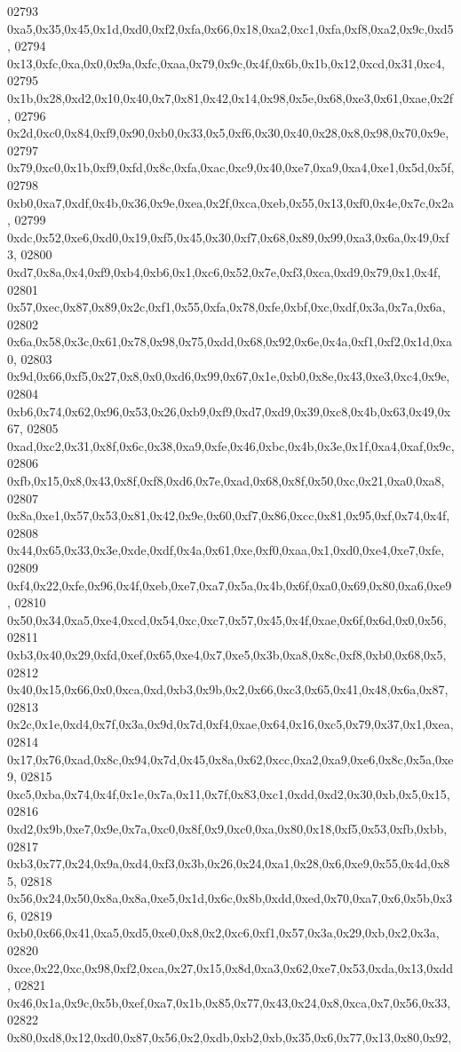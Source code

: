 \begin{DoxyCode}
02793   0xa5,0x35,0x45,0x1d,0xd0,0xf2,0xfa,0x66,0x18,0xa2,0xc1,0xfa,0xf8,0xa2,0x9c,0xd5,
02794   0x13,0xfc,0xa,0x0,0x9a,0xfc,0xaa,0x79,0x9c,0x4f,0x6b,0x1b,0x12,0xcd,0x31,0xc4,
02795   0x1b,0x28,0xd2,0x10,0x40,0x7,0x81,0x42,0x14,0x98,0x5e,0x68,0xe3,0x61,0xae,0x2f,
02796   0x2d,0xc0,0x84,0xf9,0x90,0xb0,0x33,0x5,0xf6,0x30,0x40,0x28,0x8,0x98,0x70,0x9e,
02797   0x79,0xc0,0x1b,0xf9,0xfd,0x8c,0xfa,0xac,0xc9,0x40,0xe7,0xa9,0xa4,0xe1,0x5d,0x5f,
02798   0xb0,0xa7,0xdf,0x4b,0x36,0x9e,0xea,0x2f,0xca,0xeb,0x55,0x13,0xf0,0x4e,0x7c,0x2a,
02799   0xdc,0x52,0xe6,0xd0,0x19,0xf5,0x45,0x30,0xf7,0x68,0x89,0x99,0xa3,0x6a,0x49,0xf3,
02800   0xd7,0x8a,0x4,0xf9,0xb4,0xb6,0x1,0xc6,0x52,0x7e,0xf3,0xca,0xd9,0x79,0x1,0x4f,
02801   0x57,0xec,0x87,0x89,0x2c,0xf1,0x55,0xfa,0x78,0xfe,0xbf,0xc,0xdf,0x3a,0x7a,0x6a,
02802   0x6a,0x58,0x3c,0x61,0x78,0x98,0x75,0xdd,0x68,0x92,0x6e,0x4a,0xf1,0xf2,0x1d,0xa0,
02803   0x9d,0x66,0xf5,0x27,0x8,0x0,0xd6,0x99,0x67,0x1e,0xb0,0x8e,0x43,0xe3,0xc4,0x9e,
02804   0xb6,0x74,0x62,0x96,0x53,0x26,0xb9,0xf9,0xd7,0xd9,0x39,0xc8,0x4b,0x63,0x49,0x67,
02805   0xad,0xc2,0x31,0x8f,0x6c,0x38,0xa9,0xfe,0x46,0xbc,0x4b,0x3e,0x1f,0xa4,0xaf,0x9c,
02806   0xfb,0x15,0x8,0x43,0x8f,0xf8,0xd6,0x7e,0xad,0x68,0x8f,0x50,0xc,0x21,0xa0,0xa8,
02807   0x8a,0xe1,0x57,0x53,0x81,0x42,0x9e,0x60,0xf7,0x86,0xcc,0x81,0x95,0xf,0x74,0x4f,
02808   0x44,0x65,0x33,0x3e,0xde,0xdf,0x4a,0x61,0xe,0xf0,0xaa,0x1,0xd0,0xe4,0xe7,0xfe,
02809   0xf4,0x22,0xfe,0x96,0x4f,0xeb,0xe7,0xa7,0x5a,0x4b,0x6f,0xa0,0x69,0x80,0xa6,0xe9,
02810   0x50,0x34,0xa5,0xe4,0xcd,0x54,0xc,0xc7,0x57,0x45,0x4f,0xae,0x6f,0x6d,0x0,0x56,
02811   0xb3,0x40,0x29,0xfd,0xef,0x65,0xe4,0x7,0xe5,0x3b,0xa8,0x8c,0xf8,0xb0,0x68,0x5,
02812   0x40,0x15,0x66,0x0,0xca,0xd,0xb3,0x9b,0x2,0x66,0xc3,0x65,0x41,0x48,0x6a,0x87,
02813   0x2c,0x1e,0xd4,0x7f,0x3a,0x9d,0x7d,0xf4,0xae,0x64,0x16,0xc5,0x79,0x37,0x1,0xea,
02814   0x17,0x76,0xad,0x8c,0x94,0x7d,0x45,0x8a,0x62,0xcc,0xa2,0xa9,0xe6,0x8c,0x5a,0xe9,
02815   0xc5,0xba,0x74,0x4f,0x1e,0x7a,0x11,0x7f,0x83,0xc1,0xdd,0xd2,0x30,0xb,0x5,0x15,
02816   0xd2,0x9b,0xe7,0x9e,0x7a,0xc0,0x8f,0x9,0xc0,0xa,0x80,0x18,0xf5,0x53,0xfb,0xbb,
02817   0xb3,0x77,0x24,0x9a,0xd4,0xf3,0x3b,0x26,0x24,0xa1,0x28,0x6,0xe9,0x55,0x4d,0x85,
02818   0x56,0x24,0x50,0x8a,0x8a,0xe5,0x1d,0x6c,0x8b,0xdd,0xed,0x70,0xa7,0x6,0x5b,0x36,
02819   0xb0,0x66,0x41,0xa5,0xd5,0xe0,0x8,0x2,0xc6,0xf1,0x57,0x3a,0x29,0xb,0x2,0x3a,
02820   0xce,0x22,0xc,0x98,0xf2,0xca,0x27,0x15,0x8d,0xa3,0x62,0xe7,0x53,0xda,0x13,0xdd,
02821   0x46,0x1a,0x9c,0x5b,0xef,0xa7,0x1b,0x85,0x77,0x43,0x24,0x8,0xca,0x7,0x56,0x33,
02822   0x80,0xd8,0x12,0xd0,0x87,0x56,0x2,0xdb,0xb2,0xb,0x35,0x6,0x77,0x13,0x80,0x92,

\end{DoxyCode}
